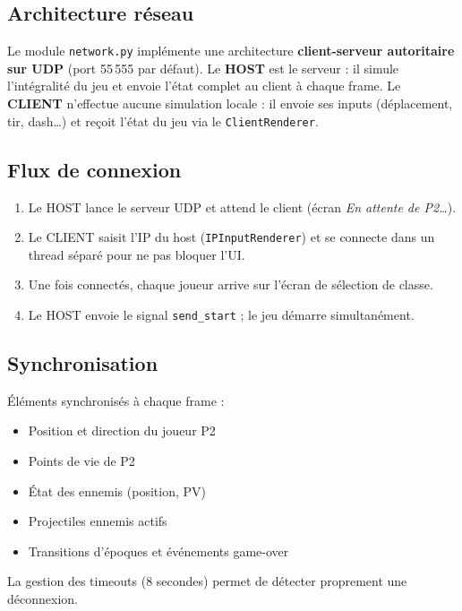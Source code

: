 \documentclass[12pt, a4paper]{report}
\begin{document}
\subsection{Architecture r\'{e}seau}

Le module \texttt{network.py} impl\'{e}mente une architecture \textbf{client-serveur autoritaire sur UDP} (port 55\,555 par d\'{e}faut). Le \textbf{HOST} est le serveur : il simule l'int\'{e}gralit\'{e} du jeu et envoie l'\'{e}tat complet au client \`{a} chaque frame. Le \textbf{CLIENT} n'effectue aucune simulation locale : il envoie ses inputs (d\'{e}placement, tir, dash\ldots) et re\c{c}oit l'\'{e}tat du jeu via le \texttt{ClientRenderer}.

\subsection{Flux de connexion}

\begin{enumerate}[noitemsep]
  \item Le HOST lance le serveur UDP et attend le client (\'{e}cran \textit{En attente de P2\ldots}).
  \item Le CLIENT saisit l'IP du host (\texttt{IPInputRenderer}) et se connecte dans un thread s\'{e}par\'{e} pour ne pas bloquer l'UI.
  \item Une fois connect\'{e}s, chaque joueur arrive sur l'\'{e}cran de s\'{e}lection de classe.
  \item Le HOST envoie le signal \texttt{send\_start} ; le jeu d\'{e}marre simultan\'{e}ment.
\end{enumerate}

\subsection{Synchronisation}

\'{E}l\'{e}ments synchronis\'{e}s \`{a} chaque frame :
\begin{itemize}[noitemsep]
  \item Position et direction du joueur P2
  \item Points de vie de P2
  \item \'{E}tat des ennemis (position, PV)
  \item Projectiles ennemis actifs
  \item Transitions d'\'{e}poques et \'{e}v\'{e}nements game-over
\end{itemize}

La gestion des timeouts (8 secondes) permet de d\'{e}tecter proprement une d\'{e}connexion.
\end{document}
